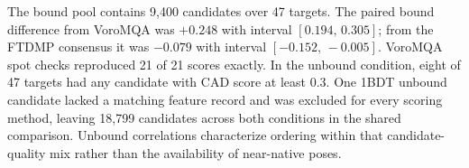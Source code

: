 \documentclass[11pt]{article}
\begin{document}
The bound pool contains 9{,}400 candidates over 47 targets. The paired bound difference from VoroMQA was $+0.248$ with interval $[0.194,\,0.305]$; from the FTDMP consensus it was $-0.079$ with interval $[-0.152,\,-0.005]$. VoroMQA spot checks reproduced 21 of 21 scores exactly. In the unbound condition, eight of 47 targets had any candidate with CAD score at least $0.3$. One 1BDT unbound candidate lacked a matching feature record and was excluded for every scoring method, leaving 18{,}799 candidates across both conditions in the shared comparison. Unbound correlations characterize ordering within that candidate-quality mix rather than the availability of near-native poses.



\end{document}
